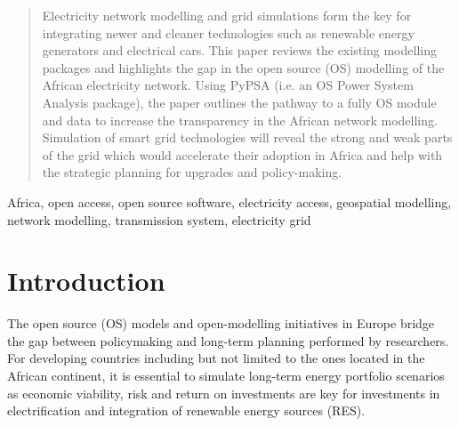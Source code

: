 \documentclass[conference, a4paper]{IEEEtran}
\begin{document}
\maketitle

\begin{abstract} %
Electricity network modelling and grid simulations form the key for integrating newer and cleaner technologies such as renewable energy generators and electrical cars. This paper reviews the existing modelling packages and highlights the gap in the open source (OS) modelling of the African electricity network.
Using PyPSA (i.e. an OS Power System Analysis package), the paper outlines the pathway to a fully OS module and data to increase the transparency in the African network modelling.
Simulation of smart grid technologies will reveal the strong and weak parts of the grid which would accelerate their adoption in Africa and help with the strategic planning for upgrades and policy-making.
\end{abstract}

\begin{IEEEkeywords} %
Africa, open access, open source software, electricity access, geospatial modelling, network modelling, transmission system, electricity grid
\end{IEEEkeywords}


 

\section{Introduction}
The open source (OS) models and open-modelling initiatives in Europe bridge the gap between policymaking and long-term planning performed by researchers. For developing countries including but not limited to the ones located in the African continent, it is essential to simulate long-term energy portfolio scenarios as economic viability, risk and return on investments are key for investments in electrification and integration of renewable energy sources (RES).
\end{document}
